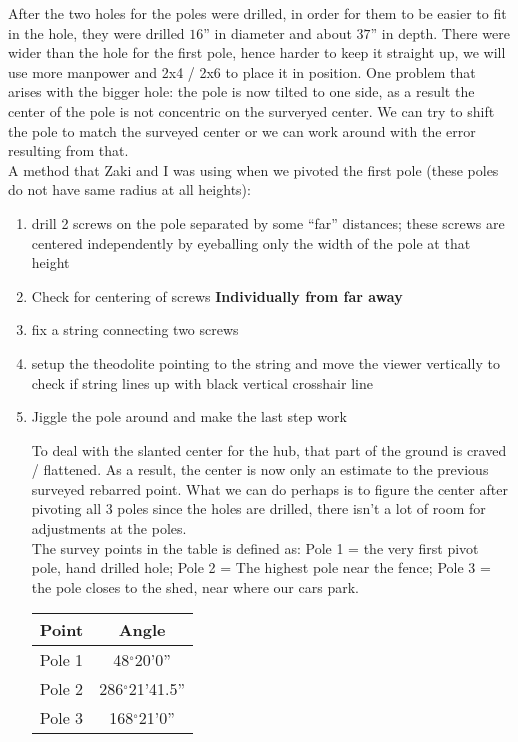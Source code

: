 \documentclass[12pt, letter]{article}
\begin{document}
After the two holes for the poles were drilled, in order for them to be easier to fit in the hole, they were drilled $16$'' in diameter and about $37$'' in depth. There were wider than the hole for the first pole, hence harder to keep it straight up, we will use more manpower and 2x4 / 2x6 to place it in position. One problem that arises with the bigger hole: the pole is now tilted to one side, as a result the center of the pole is not concentric on the surveryed center. We can try to shift the pole to match the surveyed center or we can work around with the error resulting from that.\\

A method that Zaki and I was using when we pivoted the first pole (these poles do not have same radius at all heights):
\begin{enumerate}
\item{drill 2 screws on the pole separated by some ``far'' distances; these screws are centered independently by eyeballing only the width of the pole at that height}
\item{Check for centering of screws \bf{Individually} from far away }
\item{fix a string connecting two screws}
\item{setup the theodolite pointing to the string and move the viewer vertically to check if string lines up with black vertical crosshair line}
\item{Jiggle the pole around and make the last step work}

To deal with the slanted center for the hub, that part of the ground is craved / flattened. As a result, the center is now only an estimate to the previous surveyed rebarred point. What we can do perhaps is to figure the center after pivoting all 3 poles since the holes are drilled, there isn't a lot of room for adjustments at the poles. \\


The survey points in the table is defined as:
Pole 1 = the very first pivot pole, hand drilled hole; 
Pole 2 = The highest pole near the fence; 
Pole 3 = the pole closes to the shed, near where our cars park.
 

\begin{table}[!h]
\centering
\begin{tabular}{|c|c|} \hline

Point & Angle  \\ \hline
Pole 1 & 48$^\circ$20'0'' \\ \hline
Pole 2 & 286$^\circ$21'41.5'' \\ \hline
Pole 3 & 168$^\circ$21'0'' \\ \hline



\end{tabular}
\end{table}
\end{enumerate}
\end{document}

